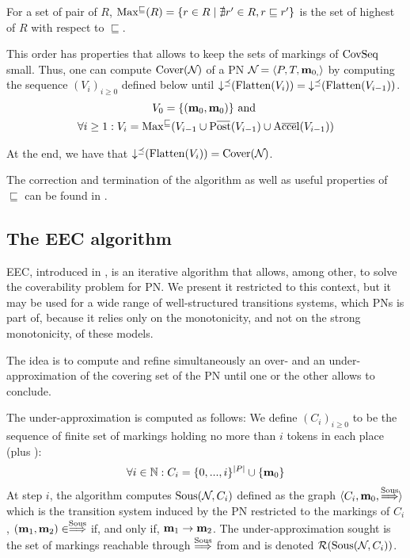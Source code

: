 For a set of pair of \omarks $R$, $\operatorname{Max^\sqsubseteq}(R) = \{ r \in R \mid \nexists r' \in R, r \sqsubseteq r'\}$ is the set of highest \omark of $R$ with respect to $\sqsubseteq$.

This order has properties \citep{Geeraerts07} that allows to keep the sets of markings of $\operatorname{CovSeq}$ small.
Thus, one can compute $\operatorname{Cover}(\mathcal{N}_{})$ of a \ac{PN} $\mathcal{N}_{} = \left\langle P_{}, T_{}, \mathbf{m}_{0,}\right\rangle$ by computing the sequence $(V_i)_{i \geq 0}$ defined below until $\operatorname{\downarrow^\preceq}(\operatorname{Flatten}(V_i)) = \operatorname{\downarrow^\preceq}(\operatorname{Flatten}(V_{i-1}))$.
\begin{gather*}
  V_0 = \{(\mari, \mari)\} \text{ and } \\
  \forall i \geq 1 : V_i = \maxs{V_{i-1} \cup \Postb(V_{i-1}) \cup \Accelb(V_{i-1})}
\end{gather*}

At the end, we have that $\operatorname{\downarrow^\preceq}(\operatorname{Flatten}(V_i)) = \operatorname{Cover}(\mathcal{N}_{})$.

The correction and termination of the algorithm as well as useful properties of $\sqsubseteq$ can be found in \cite{Geeraerts07, Ganty09}.

\subsection{The \ac{EEC} algorithm}
\label{sec:eec}

\ac{EEC}, introduced in \cite{Geeraerts07thesis, Geeraerts06}, is an iterative algorithm that allows, among other, to solve the coverability problem for \ac{PN}.
We present it restricted to this context, but it may be used for a wide range of well-structured transitions systems, which \acp{PN} is part of, because it relies only on the monotonicity, and not on the strong monotonicity, of these models.

The idea is to compute and refine simultaneously an over- and an under-approximation of the covering set of the \ac{PN} until one or the other allows to conclude.

The under-approximation is computed as follows:
We define $(C_i)_{i \geq 0}$ to be the sequence of finite set of markings holding no more than $i$ tokens in each place (plus \mari):
\[
  \forall i \in \mathbb{N} : C_i = \{0, ..., i\}^{\left|P\right|} \cup \{\mathbf{m}_0\}
\]
At step $i$, the algorithm computes $\operatorname{Sous}(\mathcal{N}_{}, C_i)$ defined as the graph $\langle C_i, \mathbf{m}_0, \stackrel{\operatorname{Sous}}{\Longrightarrow} \rangle$ which is the transition system induced by the \ac{PN} \namePN restricted to the markings of $C_i$,  $(\mathbf{m}_1, \mathbf{m}_2) \in \stackrel{\operatorname{Sous}}{\Longrightarrow}$ if, and only if, $\mathbf{m}_1 \rightarrow \mathbf{m}_2$.
The under-approximation sought is the set of markings reachable through $\stackrel{\operatorname{Sous}}{\Longrightarrow}$ from \mari and is denoted $\operatorname{\mathcal{R}}(\operatorname{Sous}(\mathcal{N}_{}, C_i))$.

